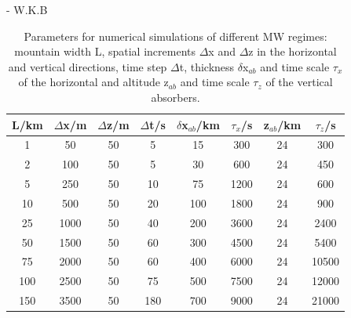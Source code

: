 - W.K.B


\begin{table}[h]
\centering
\caption{Parameters for numerical simulations of different MW regimes: mountain width L, spatial increments $\Delta$x and $\Delta$z in the horizontal and vertical directions, time step $\Delta$t, thickness $\delta$x$_{ab}$ and time scale $\tau_x$ of the horizontal and altitude z$_{ab}$ and time scale $\tau_z$ of the vertical absorbers.}

\begin{tabular}{@{}cccccccc@{}}
\toprule
L/km & $\Delta$x/m & $\Delta$z/m & $\Delta$t/s & $\delta$x$_{ab}$/km & $\tau_x$/s  & z$_{ab}$/km & $\tau_z$/s \\ \midrule[1pt]

1   & 50  & 50 & 5   & 15  & 300  & 24 & 300   \\
2   & 100  & 50 & 5   & 30  & 600  & 24 & 450   \\
5   & 250  & 50 & 10  & 75  & 1200 & 24 & 600  \\
10  & 500 & 50 & 20  & 100 & 1800 & 24 & 900  \\
25  & 1000 & 50 & 40  & 200 & 3600 & 24 & 2400  \\
50  & 1500 & 50 & 60  & 300 & 4500 & 24 & 5400  \\
75  & 2000 & 50 & 60  & 400 & 6000 & 24 & 10500 \\
100 & 2500 & 50 & 75  & 500 & 7500 & 24 & 12000 \\
150 & 3500 & 50 & 180 & 700 & 9000 & 24 & 21000 \\

\bottomrule
\end{tabular}
\label{tab:linearRegimes}
\end{table}


